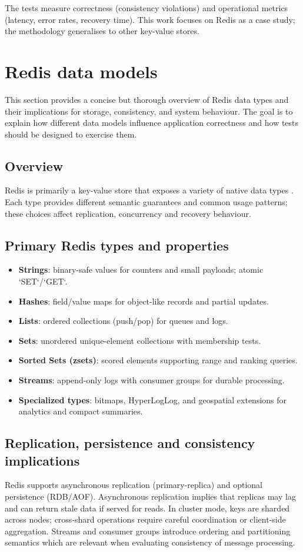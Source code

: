 \documentclass{article}
\begin{document}
The tests measure correctness (consistency violations) and operational metrics (latency, error rates, recovery time). This work focuses on Redis as a case study; the methodology generalises to other key-value stores.

\section{Redis data models}
This section provides a concise but thorough overview of Redis %
data types and their implications for storage, consistency, and %
system behaviour. The goal is to explain how different data models %
influence application correctness and how tests should be designed to exercise them.

\subsection{Overview}
Redis is primarily a key-value store that exposes a variety of native data types \cite{RedisDocs}. Each type provides different semantic guarantees and common usage patterns; these choices affect replication, concurrency and recovery behaviour.

\subsection{Primary Redis types and properties}
\begin{itemize}
    \item \textbf{Strings}: binary-safe values for counters and small payloads; atomic `SET`/`GET`.
    \item \textbf{Hashes}: field/value maps for object-like records and partial updates.
    \item \textbf{Lists}: ordered collections (push/pop) for queues and logs.
    \item \textbf{Sets}: unordered unique-element collections with membership tests.
    \item \textbf{Sorted Sets (zsets)}: scored elements supporting range and ranking queries.
    \item \textbf{Streams}: append-only logs with consumer groups for durable processing.
    \item \textbf{Specialized types}: bitmaps, HyperLogLog, and geospatial extensions for analytics and compact summaries.
\end{itemize}

\subsection{Replication, persistence and consistency implications}
Redis supports asynchronous replication (primary-replica) and optional persistence (RDB/AOF). %
Asynchronous replication implies that replicas may lag and can return stale data if served for reads.
In cluster mode, keys are sharded across nodes; cross-shard operations require %
careful coordination or client-side aggregation.
Streams and consumer groups introduce ordering and partitioning semantics %
which are relevant when evaluating consistency of message processing.
\end{document}
